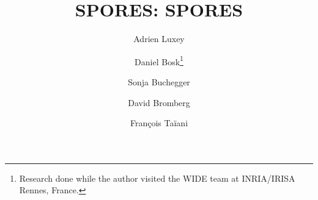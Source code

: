 \title{%
  \acs*{SPORES}: \acl*{SPORES}%
}


\author[1]{Adrien Luxey}
\author[2]{Daniel Bosk\thanks{%
    Research done while the author visited the WIDE team at INRIA/IRISA Rennes, 
    France.
  }}
\author[2]{Sonja Buchegger}
\author[1]{David Bromberg}
\author[1]{François Taïani}

